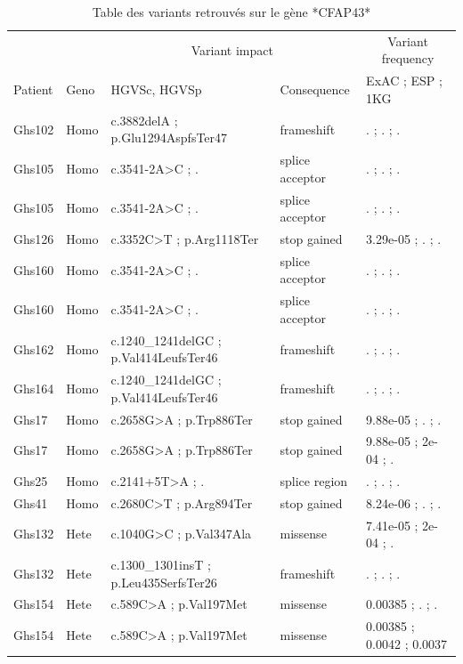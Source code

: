 \documentclass[12pt,twoside]{reedthesis}
\theoremstyle{definition}
\theoremstyle{definition}
\theoremstyle{remark}
\begin{document}
  \begin{landscape}
  \begin{longtable}[t]{lllll}
  \caption{\label{tab:tabcfap43}Table des variants retrouvés sur le gène *CFAP43*}\\
  \toprule
  \multicolumn{2}{c}{ } & \multicolumn{2}{c}{Variant impact} & \multicolumn{1}{c}{Variant frequency} \\
  \cmidrule(l{2pt}r{2pt}){3-4} \cmidrule(l{2pt}r{2pt}){5-5}
  Patient & Geno & HGVSc, HGVSp & Consequence & ExAC ; ESP ; 1KG\\
  \midrule
  Ghs102 & Homo & c.3882delA ; p.Glu1294AspfsTer47 & frameshift & . ; . ; .\\
  Ghs105 & Homo & c.3541-2A>C ; . & splice acceptor & . ; . ; .\\
  Ghs105 & Homo & c.3541-2A>C ; . & splice acceptor & . ; . ; .\\
  Ghs126 & Homo & c.3352C>T ; p.Arg1118Ter & stop gained & 3.29e-05 ; . ; .\\
  Ghs160 & Homo & c.3541-2A>C ; . & splice acceptor & . ; . ; .\\
  \addlinespace
  Ghs160 & Homo & c.3541-2A>C ; . & splice acceptor & . ; . ; .\\
  Ghs162 & Homo & c.1240\_1241delGC ; p.Val414LeufsTer46 & frameshift & . ; . ; .\\
  Ghs164 & Homo & c.1240\_1241delGC ; p.Val414LeufsTer46 & frameshift & . ; . ; .\\
  Ghs17 & Homo & c.2658G>A ; p.Trp886Ter & stop gained & 9.88e-05 ; . ; .\\
  Ghs17 & Homo & c.2658G>A ; p.Trp886Ter & stop gained & 9.88e-05 ; 2e-04 ; .\\
  \addlinespace
  Ghs25 & Homo & c.2141+5T>A ; . & splice region & . ; . ; .\\
  Ghs41 & Homo & c.2680C>T ; p.Arg894Ter & stop gained & 8.24e-06 ; . ; .\\
  Ghs132 & Hete & c.1040G>C ; p.Val347Ala & missense & 7.41e-05 ; 2e-04 ; .\\
  Ghs132 & Hete & c.1300\_1301insT ; p.Leu435SerfsTer26 & frameshift & . ; . ; .\\
  Ghs154 & Hete & c.589C>A ; p.Val197Met & missense & 0.00385 ; . ; .\\
  Ghs154 & Hete & c.589C>A ; p.Val197Met & missense & 0.00385 ; 0.0042 ; 0.0037\\
  \bottomrule
  \end{longtable}
  \end{landscape}
  
\end{document}

